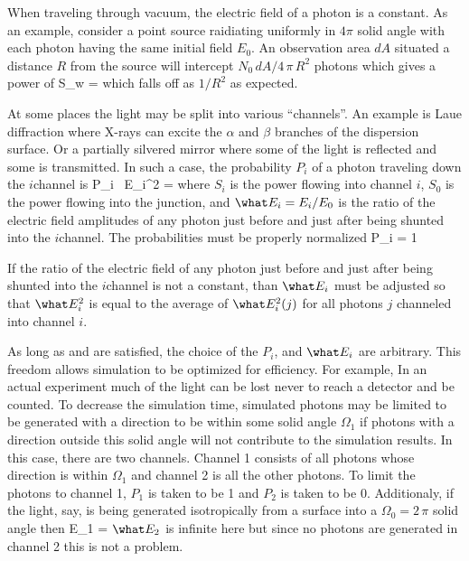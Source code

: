 When traveling through vacuum, the electric field of a photon is a
constant.  As an example, consider a point source raidiating uniformly
in $4\pi$ solid angle with each photon having the same initial field
$E_0$. An observation area $dA$ situated a distance $R$ from the
source will intercept $N_0 \, dA / 4 \, \pi \, R^2$ photons which
gives a power of
\Begineq
  S_w = 
\Endeq
which falls off as $1/R^2$ as expected.

At some places the light may be split into various ``channels''. An
example is Laue diffraction where X-rays can excite the $\alpha$ and
$\beta$ branches of the dispersion surface. Or a partially silvered
mirror where some of the light is reflected and some is transmitted.
In such a case, the probability $P_i$ of a photon traveling down the
$i$\Th channel is
\Begineq
  P_i \, \what E_i^2 = 
  \label{rpss1}
\Endeq
where $S_i$ is the power flowing into channel $i$, $S_0$ is the power
flowing into the junction, and $\what E_i = E_i / E_0$ is the ratio of
the electric field amplitudes of any photon just before and just after being
shunted into the $i$\Th channel. The probabilities must be properly
normalized
\Begineq
  \sum P_i = 1
  \label{p1}
\Endeq

If the ratio of the electric field of any photon just before and just
after being shunted into the $i$\Th channel is not a constant, than
$\what E_i$ must be adjusted so that $\what E_i^2$ is equal to the average of
$\what E_i^2(j)$ for all photons $j$ channeled into channel $i$.

As long as  and  are satisfied, the choice of the
$P_i$, and $\what E_i$ are arbitrary. This freedom allows simulation to be
optimized for efficiency. For example, In an actual experiment much of
the light can be lost never to reach a detector and be counted. To
decrease the simulation time, simulated photons may be limited to be
generated with a direction to be within some solid angle $\Omega_1$ if
photons with a direction outside this solid angle will not contribute
to the simulation results. In this case, there are two channels.
Channel 1 consists of all photons whose direction is within
$\Omega_1$ and channel 2 is all the other photons. To limit the
photons to channel 1, $P_1$ is taken to be 1 and $P_2$ is taken to be
0. Additionaly, if the light, say, is being generated isotropically
from a surface into a $\Omega_0 = 2 \, \pi$ solid angle then
\Begineq
  \what E_1 = 
  \label{roo}
\Endeq
$\what E_2$ is infinite here but since no photons are generated in channel 2
this is not a problem.

